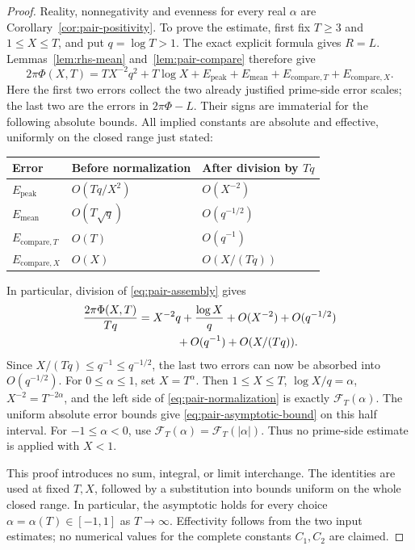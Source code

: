 \documentclass[11pt]{article}
\begin{document}
\begin{proof}
Reality, nonnegativity and evenness for every real \(\alpha\) are
Corollary~\ref{cor:pair-positivity}. To prove the estimate, first fix
\(T\geq3\) and \(1\leq X\leq T\), and put \(q=\log T>1\).
The exact explicit formula gives \(R=L\).
Lemmas~\ref{lem:rhs-mean} and~\ref{lem:pair-compare} therefore give
\begin{equation}\label{eq:pair-assembly}
 2\pi\Phi(X,T)
 =TX^{-2}q^2+T\log X
   +E_{\mathrm{peak}}+E_{\mathrm{mean}}
   +E_{\mathrm{compare},T}+E_{\mathrm{compare},X}.
\end{equation}
Here the first two errors collect the two already justified
prime-side error scales; the last two are the errors in \(2\pi\Phi-L\).
Their signs are immaterial for the following absolute bounds.
All implied constants are absolute and effective, uniformly on the
closed range just stated:
\begin{center}
\begin{tabular}{lll}
\toprule
Error & Before normalization & After division by \(Tq\)\\
\midrule
\(E_{\mathrm{peak}}\) & \(O(Tq/X^2)\) & \(O(X^{-2})\)\\
\(E_{\mathrm{mean}}\) & \(O(T\sqrt q)\) & \(O(q^{-1/2})\)\\
\(E_{\mathrm{compare},T}\) & \(O(T)\) & \(O(q^{-1})\)\\
\(E_{\mathrm{compare},X}\) & \(O(X)\) & \(O(X/(Tq))\)\\
\bottomrule
\end{tabular}
\end{center}
In particular, division of \eqref{eq:pair-assembly} gives
\begin{align}\label{eq:pair-normalization}
 \frac{2\pi\Phi(X,T)}{Tq}
 &=X^{-2}q+\frac{\log X}{q}
   +O(X^{-2})+O(q^{-1/2})\notag\\
 &\hspace{12mm}+O(q^{-1})+O(X/(Tq)).
\end{align}
Since \(X/(Tq)\leq q^{-1}\leq q^{-1/2}\), the last two errors
can now be absorbed into \(O(q^{-1/2})\).
For \(0\leq\alpha\leq1\), set \(X=T^\alpha\).
Then \(1\leq X\leq T\), \(\log X/q=\alpha\), \(X^{-2}=T^{-2\alpha}\),
and the left side of \eqref{eq:pair-normalization} is exactly
\(\mathcal F_T(\alpha)\). The uniform absolute error bounds give
\eqref{eq:pair-asymptotic-bound} on this half interval. For
\(-1\leq\alpha<0\), use
\(\mathcal F_T(\alpha)=\mathcal F_T(|\alpha|)\).
Thus no prime-side estimate is applied with \(X<1\).

This proof introduces no sum, integral, or limit interchange.
The identities are used at fixed \(T,X\), followed by a substitution
into bounds uniform on the whole closed range. In particular, the
asymptotic holds for every choice \(\alpha=\alpha(T)\in[-1,1]\)
as \(T\to\infty\). Effectivity follows from the two input estimates;
no numerical values for the complete constants \(C_1,C_2\) are claimed.
\end{proof}
\end{document}
